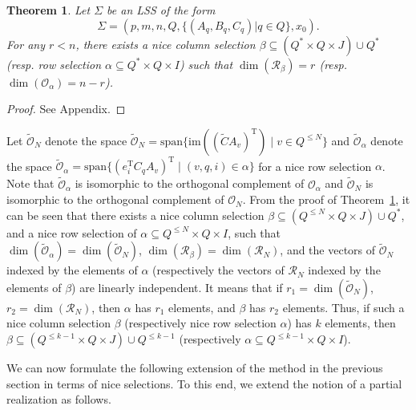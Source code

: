 \documentclass[journal]{IEEEtran}
\newcommand{\IM}{\mathrm{im}}
\newcommand{\SPAN}{\mathrm{span}}
\newtheorem{Theorem}{Theorem}
\begin{document}
\begin{Theorem} \label{lem:nice_selections}
	Let $\Sigma$ be an LSS of the form 
	\[\Sigma=(p,m,n,Q,\{(A_q,B_q,C_q)|q \in Q\},x_0).\]
	For any $r<n$, there exists a nice column selection $\beta \subseteq (Q^* \times Q \times J) \cup Q^*$ (resp. row selection $\alpha \subseteq Q^* \times Q \times I$) such that $\dim (\mathscr{R}_\beta)=r$ (resp. $ \dim (\mathscr{O}_\alpha)=n-r$). 
\end{Theorem}

\begin{proof}
	See Appendix.
\end{proof}

Let $\widetilde{\mathscr{O}}_N$ denote the space $\widetilde{\mathscr{O}}_N= \SPAN \{ \IM ((\widetilde{C}A_v)^\mathrm{T}) \mid v \in Q^{\leq N} \}$ and $\widetilde{\mathscr{O}}_\alpha$ denote the space $\widetilde{\mathscr{O}}_\alpha= \SPAN \{ (e_i^\mathrm{T}C_qA_v)^\mathrm{T} \mid (v,q,i) \in \alpha \}$ for a nice row selection $\alpha$. Note that $\widetilde{\mathscr{O}}_\alpha$ is isomorphic to the orthogonal complement of $\mathscr{O}_{\alpha}$ and $\widetilde{\mathscr{O}}_N$ is isomorphic to the orthogonal complement of $\mathscr{O}_{N}$. From the proof of Theorem~\ref{lem:nice_selections}, it can be seen that there exists a nice column selection $\beta \subseteq (Q^{\le N} \times Q \times J) \cup Q^*$, and a nice row selection of $\alpha \subseteq Q^{\le N} \times Q \times I$, such that $\dim (\widetilde{\mathscr{O}}_{\alpha})=\dim (\widetilde{\mathscr{O}}_N)$, $\dim (\mathscr{R}_{\beta})=\dim (\mathscr{R}_N)$, and the vectors of $\widetilde{\mathscr{O}}_N$ indexed by the elements of $\alpha$ (respectively the vectors of $\mathscr{R}_N$ indexed by the elements of $\beta$) are linearly independent. It means that if $r_1=\dim (\widetilde{\mathscr{O}}_N)$, $r_2=\dim (\mathscr{R}_N)$, then $\alpha$ has $r_1$ elements, and $\beta$ has $r_2$ elements. Thus, if such a nice column selection $\beta$ (respectively nice row selection $\alpha$) has $k$ elements, then $\beta \subseteq (Q^{\le k-1} \times Q \times J) \cup Q^{\le k-1}$ (respectively $\alpha \subseteq Q^{\le k-1} \times Q \times I$).

We can now formulate the following extension of the method in the previous section in terms of nice selections. To this end, we extend the notion of a partial realization as follows.
\end{document}
